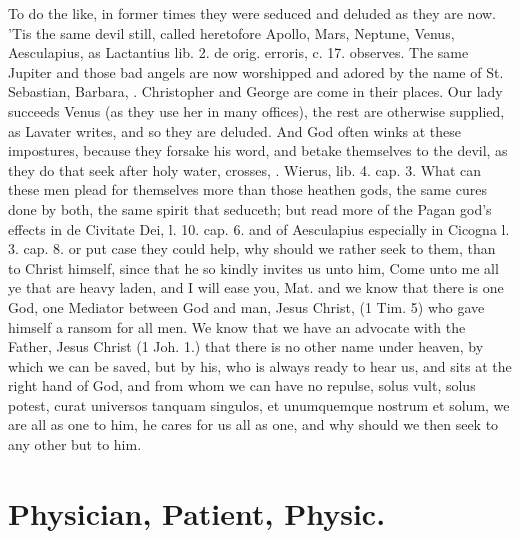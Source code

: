 {To do the like, in former times they were seduced and deluded as they
are now. 'Tis the same devil still, called heretofore Apollo, Mars,
Neptune, Venus, Aesculapius, \etc{} as Lactantius lib. 2. de orig.
erroris, c. 17. observes. The same Jupiter and those bad angels are now
worshipped and adored by the name of St. Sebastian, Barbara, \etc{}.
Christopher and George are come in their places. Our lady succeeds
Venus (as they use her in many offices), the rest are otherwise
supplied, as Lavater writes, and so they are deluded. And
God often winks at these impostures, because they forsake his word, and
betake themselves to the devil, as they do that seek after holy water,
crosses, \etc{}. Wierus, lib. 4. cap. 3. What can these men plead for
themselves more than those heathen gods, the same cures done by both,
the same spirit that seduceth; but read more of the Pagan god's effects
in \Austin{} de Civitate Dei, l. 10. cap. 6. and of Aesculapius especially
in Cicogna l. 3. cap. 8. or put case they could help, why should we
rather seek to them, than to Christ himself, since that he so kindly
invites us unto him, Come unto me all ye that are heavy laden, and I
will ease you, Mat.  and we know that there is one God, one Mediator
between God and man, Jesus Christ, (1 Tim.  5) who gave himself a
ransom for all men. We know that we have an  advocate with the
Father, Jesus Christ (1 Joh.  1.) that there is no other name under
heaven, by which we can be saved, but by his, who is always ready to
hear us, and sits at the right hand of God, and from  whom we can
have no repulse, solus vult, solus potest, curat universos tanquam
singulos, et unumquemque nostrum et solum, we are all as one to
him, he cares for us all as one, and why should we then seek to any
other but to him.


\section{Physician, Patient, Physic.}

}
